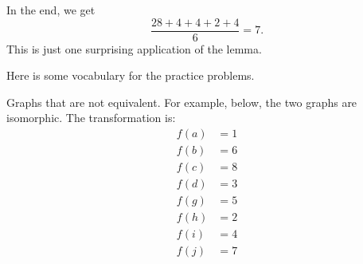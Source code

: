 \documentclass[11pt]{scrartcl}
\begin{document}
In the end, we get \[\dfrac{28+4+4+2+4}{6} = \boxed{7}.\] This is just one surprising application of the lemma.

Here is some vocabulary for the practice problems.

\begin{definition*}
Graphs that are not equivalent. For example, below, the two graphs are isomorphic. The transformation is: 
\begin{align*}
f(a) &= 1 \\
f(b) &= 6 \\
f(c) &= 8 \\
f(d) &= 3 \\
f(g) &= 5 \\
f(h) &= 2 \\
f(i) &= 4 \\
f(j) &= 7 \\
\end{align*}
\end{definition*}
\end{document}
